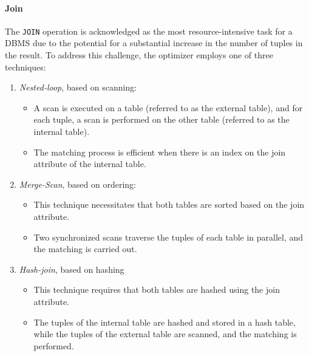 \paragraph*{Join}
The \texttt{JOIN} operation is acknowledged as the most resource-intensive task for a DBMS due to the potential for a substantial increase in the number of tuples in the result. 
To address this challenge, the optimizer employs one of three techniques:
\begin{enumerate}
\item \textit{Nested-loop}, based on scanning: 
    \begin{itemize}
        \item A scan is executed on a table (referred to as the external table), and for each tuple, a scan is performed on the other table (referred to as the internal table).
        \item The matching process is efficient when there is an index on the join attribute of the internal table.
    \end{itemize}
\item \textit{Merge-Scan}, based on ordering:
    \begin{itemize}
        \item This technique necessitates that both tables are sorted based on the join attribute.
        \item Two synchronized scans traverse the tuples of each table in parallel, and the matching is carried out.
    \end{itemize}
\item \textit{Hash-join}, based on hashing
    \begin{itemize}
        \item This technique requires that both tables are hashed using the join attribute.
        \item The tuples of the internal table are hashed and stored in a hash table, while the tuples of the external table are scanned, and the matching is performed.
    \end{itemize}
\end{enumerate}

